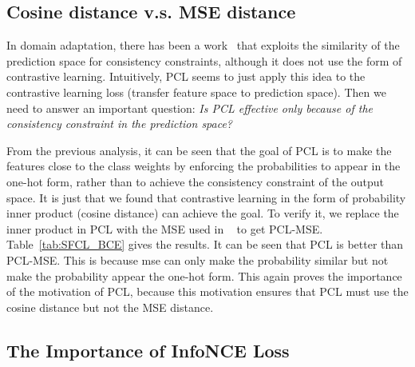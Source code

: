 \subsection{Cosine distance v.s. MSE distance}

In domain adaptation, there has been a work~\cite{french2017self} that exploits the similarity of the prediction space for consistency constraints, although it does not use the form of contrastive learning. Intuitively, PCL seems to just apply this idea to the contrastive learning loss (transfer feature space to prediction space). Then we need to answer an important question: \textit{Is PCL effective only because of the consistency constraint in the prediction space?}

From the previous analysis, it can be seen that the goal of PCL is to make the features close to the class weights by enforcing the probabilities to appear in the one-hot form, rather than to achieve the consistency constraint of the output space. It is just that we found that contrastive learning in the form of probability inner product (cosine distance) can achieve the goal.
To verify it, we replace the inner product in PCL with the MSE used in ~\cite{french2017self} to get PCL-MSE. Table~\ref{tab:SFCL_BCE} gives the results. It can be seen that PCL is better than PCL-MSE. This is because mse can only make the probability similar but not make the probability appear the one-hot form. This again proves the importance of the motivation of PCL, because this motivation ensures that PCL must use the cosine distance but not the MSE distance.


\subsection{The Importance of InfoNCE Loss}

